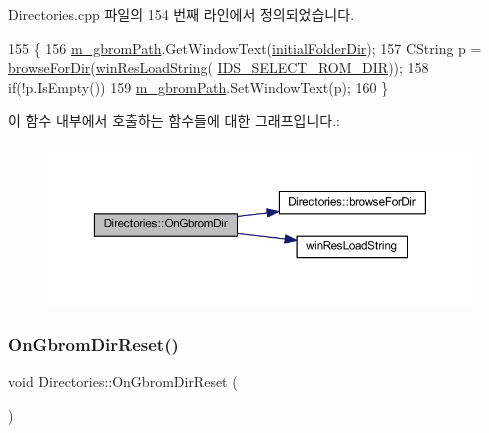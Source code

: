 Directories.\+cpp 파일의 154 번째 라인에서 정의되었습니다.


\begin{DoxyCode}
155 \{
156   \mbox{\hyperlink{class_directories_adffa22cb6f6be3c0b7327670dd885f83}{m\_gbromPath}}.GetWindowText(\mbox{\hyperlink{class_directories_a5f307fd959af44c194c520b5452cafba}{initialFolderDir}});
157   CString p = \mbox{\hyperlink{class_directories_a7e24bf265fe6af9c01e0939952c337e1}{browseForDir}}(\mbox{\hyperlink{_win_res_util_8cpp_a416e85e80ab9b01376e87251c83d1a5a}{winResLoadString}}(
      \mbox{\hyperlink{resource_8h_ac7ad8d2bd13949a3e3f83005e3b2af6b}{IDS\_SELECT\_ROM\_DIR}}));
158   \textcolor{keywordflow}{if}(!p.IsEmpty())
159     \mbox{\hyperlink{class_directories_adffa22cb6f6be3c0b7327670dd885f83}{m\_gbromPath}}.SetWindowText(p);
160 \}
\end{DoxyCode}
이 함수 내부에서 호출하는 함수들에 대한 그래프입니다.\+:
\nopagebreak
\begin{figure}[H]
\begin{center}
\leavevmode
\includegraphics[width=350pt]{class_directories_acb13ecb0add4c5e10ed47d40d6a8605c_cgraph}
\end{center}
\end{figure}
\mbox{\label{class_directories_aa323eb09c0caba8b8e5ff7984fd8e2e6}} 
\subsubsection{\texorpdfstring{On\+Gbrom\+Dir\+Reset()}{OnGbromDirReset()}}
{\footnotesize\ttfamily void Directories\+::\+On\+Gbrom\+Dir\+Reset (\begin{DoxyParamCaption}{ }\end{DoxyParamCaption})\hspace{0.3cm}{\ttfamily [protected]}}



